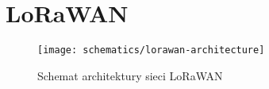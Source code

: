 \section{LoRaWAN\label{sect:lorawan}}

\begin{figure}[!htbp]
    \centering
    \texttt{[image: schematics/lorawan-architecture]}
    \caption{\label{img:lorawan-architecture}Schemat architektury sieci LoRaWAN}
\end{figure}